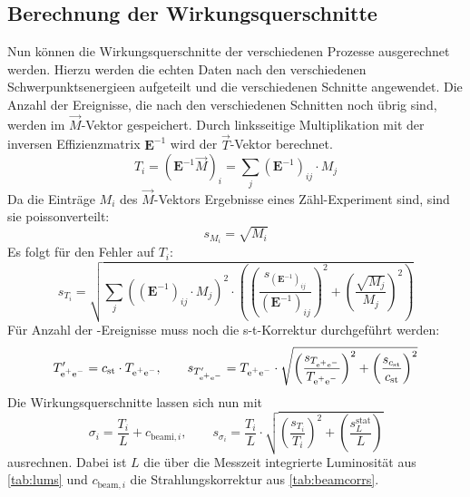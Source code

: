 \subsection{Berechnung der Wirkungsquerschnitte}
Nun können die Wirkungsquerschnitte der verschiedenen Prozesse ausgerechnet werden. Hierzu werden die echten Daten nach den verschiedenen 
Schwerpunktsenergieen aufgeteilt und die verschiedenen Schnitte angewendet. Die Anzahl der Ereignisse, die nach den verschiedenen Schnitten 
noch übrig sind, werden im $\vec{M}$-Vektor gespeichert. Durch linksseitige Multiplikation mit der inversen Effizienzmatrix $\bm{E}^{-1}$ 
wird der $\vec{T}$-Vektor berechnet.
\begin{equation}
    T_i = \left( \bm{E}^{-1} \vec{M} \right)_i = \sum_j (\bm{E}^{-1})_{ij} \cdot M_j
\end{equation}
Da die Einträge $M_i$ des $\vec{M}$-Vektors Ergebnisse eines Zähl-Experiment sind, sind sie poissonverteilt:
\begin{equation}
    s_{M_i} = \sqrt{M_i}
\end{equation}
Es folgt für den Fehler auf $T_i$:
\begin{equation}
    s_{T_i} = \sqrt{\sum_j \left( (\bm{E}^{-1})_{ij} \cdot M_j \right)^2 \cdot 
    \left( \left( \frac{s_{(\bm{E}^{-1})_{ij}}}{(\bm{E}^{-1})_{ij}} \right)^2 + \left( \frac{\sqrt{M_j}}{M_j} \right)^2 \right) }
\end{equation}
Für Anzahl der \ee -Ereignisse muss noch die s-t-Korrektur durchgeführt werden:
\begin{equation}
    T_\text{e$^+$e$^-$}' = c_\text{st} \cdot T_\text{e$^+$e$^-$}, \qquad 
    s_{T_\text{e$^+$e$^-$}'} = T_\text{e$^+$e$^-$} \cdot \sqrt{ \left( \frac{s_{T_\text{e$^+$e$^-$}}}{T_\text{e$^+$e$^-$}} \right)^2 + \left( \frac{s_{c_\text{st}}}{c_\text{st}} \right)^2 }
\end{equation}
Die Wirkungsquerschnitte lassen sich nun mit 
\begin{equation}
    \sigma_i = \frac{T_i}{L} + c_{\text{beami}, i}, \qquad 
    s_{\sigma_i} = \frac{T_i}{L} \cdot \sqrt{ \left( \frac{s_{T_i}}{T_i} \right)^2 + \left( \frac{s_L^\text{stat}}{L} \right) }
\end{equation}
ausrechnen. Dabei ist $L$ die über die Messzeit integrierte Luminosität aus \autoref{tab:lums} 
und $c_{\text{beam}, i}$ die Strahlungskorrektur aus \autoref{tab:beamcorrs}.

